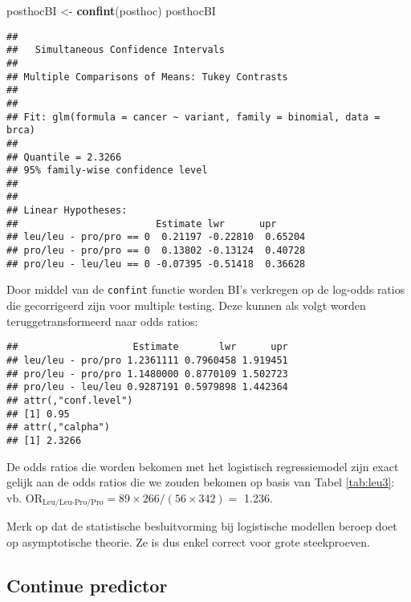 \documentclass[
  12pt,dutch,coursenotes]{book}
\newenvironment{Shaded}{\begin{snugshade}}{\end{snugshade}}
\newcommand{\KeywordTok}[1]{\textcolor[rgb]{0.13,0.29,0.53}{\textbf{#1}}}
\newcommand{\NormalTok}[1]{#1}
\newcommand{\OperatorTok}[1]{\textcolor[rgb]{0.81,0.36,0.00}{\textbf{#1}}}
\newcommand{\StringTok}[1]{\textcolor[rgb]{0.31,0.60,0.02}{#1}}
\theoremstyle{definition}
\theoremstyle{definition}
\theoremstyle{definition}
\theoremstyle{remark}
\begin{document}
\begin{Shaded}
\begin{Highlighting}[]
\NormalTok{posthocBI \textless{}{-}}\StringTok{ }\KeywordTok{confint}\NormalTok{(posthoc)}
\NormalTok{posthocBI}
\end{Highlighting}
\end{Shaded}

\begin{verbatim}
## 
##   Simultaneous Confidence Intervals
## 
## Multiple Comparisons of Means: Tukey Contrasts
## 
## 
## Fit: glm(formula = cancer ~ variant, family = binomial, data = brca)
## 
## Quantile = 2.3266
## 95% family-wise confidence level
##  
## 
## Linear Hypotheses:
##                        Estimate lwr      upr     
## leu/leu - pro/pro == 0  0.21197 -0.22810  0.65204
## pro/leu - pro/pro == 0  0.13802 -0.13124  0.40728
## pro/leu - leu/leu == 0 -0.07395 -0.51418  0.36628
\end{verbatim}

Door middel van de \texttt{confint} functie worden BI's verkregen op de log-odds ratios die gecorrigeerd zijn voor multiple testing. Deze kunnen als volgt worden teruggetransformeerd naar odds ratios:

\begin{Shaded}
\end{Shaded}

\begin{verbatim}
##                    Estimate       lwr      upr
## leu/leu - pro/pro 1.2361111 0.7960458 1.919451
## pro/leu - pro/pro 1.1480000 0.8770109 1.502723
## pro/leu - leu/leu 0.9287191 0.5979898 1.442364
## attr(,"conf.level")
## [1] 0.95
## attr(,"calpha")
## [1] 2.3266
\end{verbatim}

De odds ratios die worden bekomen met het logistisch regressiemodel zijn exact gelijk aan de odds ratios die we zouden bekomen op basis van Tabel \ref{tab:leu3}:
vb. \(\text{OR}_\text{Leu/Leu-Pro/Pro}=89\times 266/(56\times 342)=\) 1.236.

Merk op dat de statistische besluitvorming bij logistische modellen beroep doet op asymptotische theorie. Ze is dus enkel correct voor grote steekproeven.

\hypertarget{continue-predictor}{%
\subsection{Continue predictor}\label{continue-predictor}}
\end{document}
